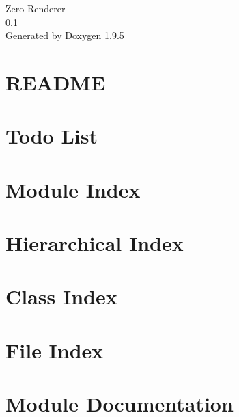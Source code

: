 \documentclass[twoside]{book}
\newcommand{\+}{\discretionary{\mbox{\scriptsize$\hookleftarrow$}}{}{}}
\newcommand{\clearemptydoublepage}{%
    \newpage{\pagestyle{empty}\cleardoublepage}%
  }
\begin{document}
  \raggedbottom
    \hypersetup{pageanchor=false,
                bookmarksnumbered=true,
                pdfencoding=unicode
               }
  \begin{titlepage}
  \vspace*{7cm}
  \begin{center}%
  {\Large Zero-\/\+Renderer}\\
  [1ex]\large 0.\+1 \\
  \vspace*{1cm}
  {\large Generated by Doxygen 1.9.5}\\
  \end{center}
  \end{titlepage}
  \clearemptydoublepage
  \tableofcontents
  \clearemptydoublepage
  \hypersetup{pageanchor=true}
\chapter{README}
\label{md__mnt_renderer__zero_src__resource_layer__file__r_e_a_d_m_e}

\chapter{Todo List}
\label{todo}

\chapter{Module Index}

\chapter{Hierarchical Index}

\chapter{Class Index}

\chapter{File Index}

\chapter{Module Documentation}







\end{document}
